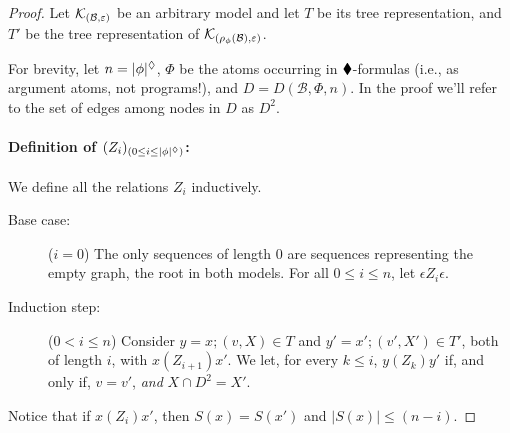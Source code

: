 \documentclass{llncs}
\newcommand{\kmod}[2]{{\cal K}_{(#1,#2)}}
\newcommand{\views}{\mathcal B}
\newcommand{\sem}{\varepsilon}
\newcommand{\depth}[1]{|{#1}|^\adia}
\begin{document}
\begin{proof}
Let $\kmod \views \sem$ be an arbitrary model and let $T$ be its tree representation, and $T'$ be the tree representation of $\kmod {\rho_\phi(\views)} \sem$. %

For brevity, let $n = \depth{\phi}$, $\Phi$ be the atoms occurring in $\blacklozenge$-formulas (i.e., as argument atoms, not programs!), and $D = D(\views, \Phi, n)$. In the proof we'll refer to the set of edges among nodes in $D$ as $D^2$.

\paragraph{Definition of $(Z_i)_{(0 \leq i \leq \depth{\phi})}$: } 
We define all the relations $Z_i$ inductively. 
\begin{description}
\item[Base case: ] ($i = 0$) The only sequences of length $0$ are sequences representing the empty graph, the root in both models. For all $0 \leq i \leq n$, let $\epsilon Z_i \epsilon$. 
\item[Induction step: ] ($0 < i \leq n$) Consider $y = x;(v, X) \in T$ and $y' = x';(v', X') \in T'$, both of length $i$, with $x (Z_{i+1}) x'$. We let, for every $k \leq i$, $y (Z_k) y'$ if, and only if, $v = v'$, \emph{and} $X \cap D^2 = X'$.
\end{description}

Notice that if $x (Z_i) x'$, then $S(x) = S(x')$ and $|S(x)| \leq (n - i)$. 


\end{proof}
\end{document}
